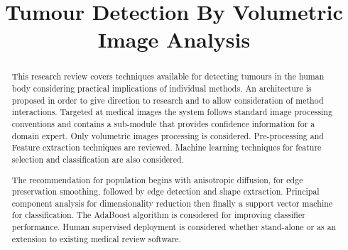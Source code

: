 \documentclass[journal]{IEEEtran}
\begin{document}
\title{Tumour Detection By Volumetric Image Analysis}
\author{
}


{}

\maketitle


\begin{abstract}

This research review covers techniques available for detecting tumours in the human body considering practical implications of individual methods.   
An architecture is proposed in order to give direction to research and to allow consideration of method interactions.
Targeted at medical images the system follows standard image processing conventions and contains a sub-module that provides confidence information for a domain expert.  
Only volumetric images processing is considered.
Pre-processing and Feature extraction techniques are reviewed. 
Machine learning techniques for feature selection and classification are also considered. 

The recommendation for population begins with anisotropic diffusion, for edge preservation smoothing, followed by edge detection and shape extraction.
Principal component analysis for dimensionality reduction then finally a support vector machine for classification.
The AdaBoost algorithm is considered for improving classifier performance.
Human supervised deployment is considered whether stand-alone or as an extension to existing medical review software.

\end{abstract}










\IEEEpeerreviewmaketitle
\end{document}
